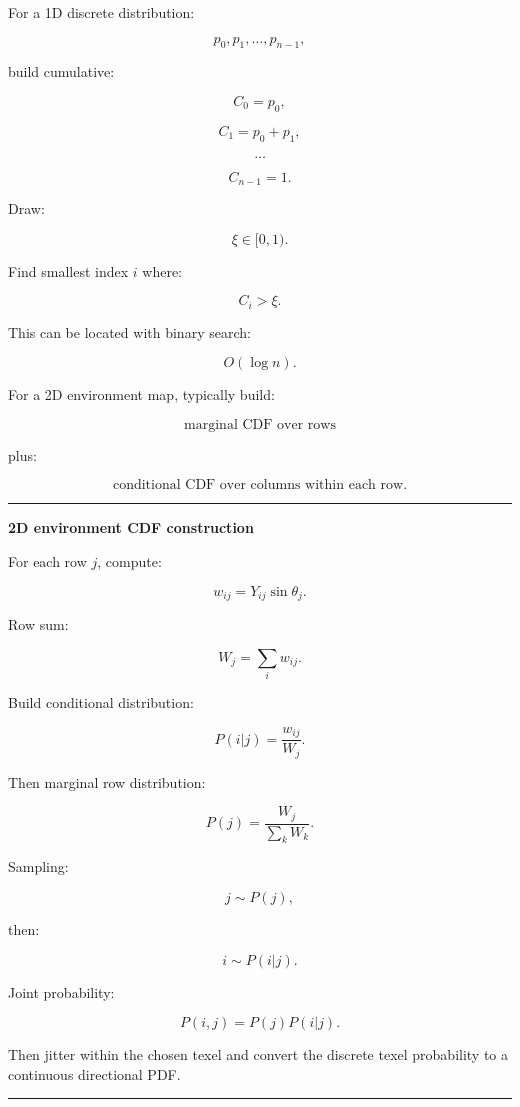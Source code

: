 For a 1D discrete distribution:

\[
p_0,p_1,\dots,p_{n-1},
\]

build cumulative:

\[
C_0=p_0,
\]

\[
C_1=p_0+p_1,
\]

\[
\dots
\]

\[
C_{n-1}=1.
\]

Draw:

\[
\xi\in[0,1).
\]

Find smallest index \(i\) where:

\[
C_i>\xi.
\]

This can be located with binary search:

\[
O(\log n).
\]

For a 2D environment map, typically build:

\[
\boxed{
\text{marginal CDF over rows}
}
\]

plus:

\[
\boxed{
\text{conditional CDF over columns within each row}.
}
\]

\begin{center}\rule{0.5\linewidth}{0.5pt}\end{center}

\textbf{2D environment CDF construction}

For each row \(j\), compute:

\[
w_{ij}
=
Y_{ij}\sin\theta_j.
\]

Row sum:

\[
W_j=
\sum_iw_{ij}.
\]

Build conditional distribution:

\[
P(i|j)
=
\frac{w_{ij}}{W_j}.
\]

Then marginal row distribution:

\[
P(j)
=
\frac{W_j}{\sum_kW_k}.
\]

Sampling:

\[
j\sim P(j),
\]

then:

\[
i\sim P(i|j).
\]

Joint probability:

\[
\boxed{
P(i,j)=P(j)P(i|j).
}
\]

Then jitter within the chosen texel and convert the discrete texel probability to a continuous directional PDF.

\begin{center}\rule{0.5\linewidth}{0.5pt}\end{center}

